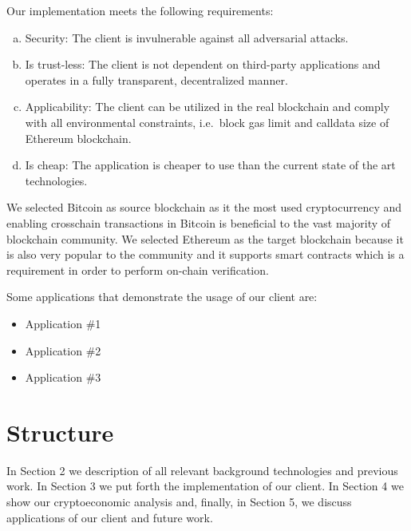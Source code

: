 \bigbreak
Our implementation meets the following requirements:
\begin{enumerate}[(a)]

    \item
        Security: The client is invulnerable against all adversarial attacks.

    \item Is trust-less: The client is not dependent on third-party
        applications and operates in a fully transparent, decentralized manner.

    \item Applicability: The client can be utilized in the real blockchain and
        comply with all environmental constraints, i.e.\ block gas limit and
        calldata size of Ethereum blockchain.

    \item Is cheap: The application is cheaper to use than the current state of
        the art technologies. 

\end{enumerate}

We selected Bitcoin as source blockchain as it the most used cryptocurrency and
enabling crosschain transactions in Bitcoin is beneficial to the vast majority
of blockchain community. We selected Ethereum as the target blockchain because
it is also very popular to the community and it supports smart contracts which
is a requirement in order to perform on-chain verification.

\bigbreak Some applications that demonstrate the usage of our client are:

\begin{itemize}
    \item{Application \#1}
    \item{Application \#2}
    \item{Application \#3}
\end{itemize}

\section{Structure}

In Section 2 we description of all relevant background technologies and
previous work. In Section 3 we put forth the implementation of our client. In
Section 4 we show our cryptoeconomic analysis and, finally, in Section 5, we
discuss applications of our client and future work.
